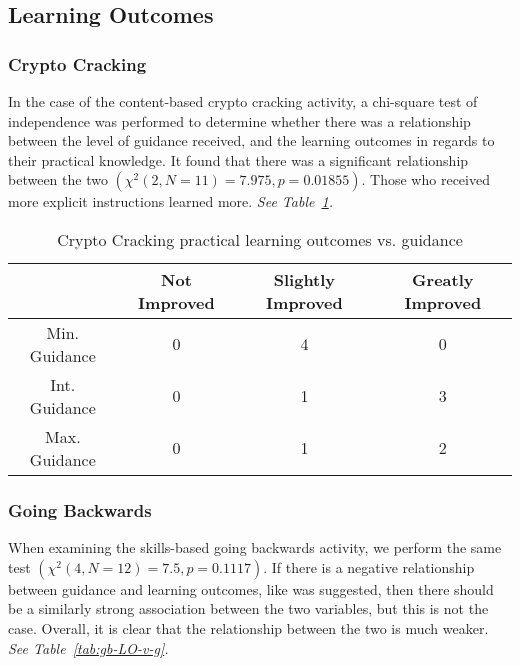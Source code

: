     \subsection{Learning Outcomes}

        \subsubsection*{Crypto Cracking}
            In the case of the content-based crypto cracking activity, a chi-square test of independence was performed to determine whether there was a relationship between the level of guidance received, and the learning outcomes in regards to their practical knowledge. %
It found that there was a significant relationship between the two $(\chi^2(2, N=11)=7.975,  p = 0.01855)$. %
Those who received more explicit instructions learned more. %
\emph{See Table~\ref{tab:cc-pLO-v-g}.}

            \begin{table}
            \begin{center}
                \begin{tabular}{|c|c|c|c|}
                    \hline
                        & Not Improved & Slightly Improved & Greatly Improved \\
                    \hline
                    Min. %
Guidance & 0 & 4 & 0\\
                    \hline
                    Int. %
Guidance & 0 & 1 & 3\\
                    \hline
                    Max. %
Guidance & 0 & 1 & 2\\
                    \hline
                \end{tabular}

                \caption{Crypto Cracking practical learning outcomes vs. %
guidance}\label{tab:cc-pLO-v-g}
            \end{center}
            \end{table}

        \subsubsection*{Going Backwards}
            When examining the skills-based going backwards activity, we perform the same test $(\chi^2(4, N=12)=7.5,  p = 0.1117)$. %
If there is a negative relationship between guidance and learning outcomes, like was suggested, then there should be a similarly strong association between the two variables, but this is not the case. %
Overall, it is clear that the relationship between the two is much weaker. %
\emph{See Table~\ref{tab:gb-LO-v-g}.} 


